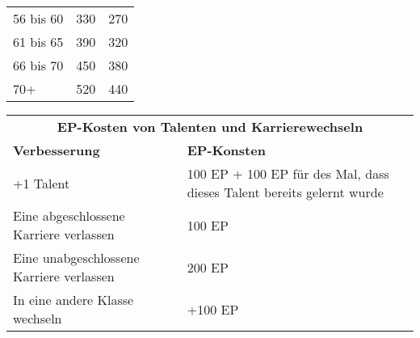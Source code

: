 \documentclass[a4paper, fontsize=11pt]{scrartcl}
\begin{document}
\begin{table}[!ht]
\begin{tabularx}{\textwidth}{l|l|l}
        56 bis 60                     & 330                                          & 270                                     \\ \cline{1-3}
        61 bis 65                     & 390                                          & 320                                     \\ \cline{1-3}
        66 bis 70                     & 450                                          & 380                                     \\ \cline{1-3}
        70+                           & 520                                          & 440
    \end{tabularx}
\end{table}

\begin{table}[!ht]
    \centering
    \begin{tabularx}{\textwidth}{l|X}
        \multicolumn{2}{c}{\cellcolor{gray!25} \textbf{EP-Kosten von Talenten und Karrierewechseln}                                                 } \\ \cline{1-2}
        \textbf{Verbesserung}                    & \textbf{EP-Konsten}                                                                                \\ \cline{1-2}
        +1 Talent                                & 100 EP + 100 EP für des Mal, dass dieses Talent bereits gelernt wurde                              \\ \cline{1-2}
        Eine abgeschlossene Karriere verlassen   & 100 EP                                                                                             \\ \cline{1-2}
        Eine unabgeschlossene Karriere verlassen & 200 EP                                                                                             \\ \cline{1-2}
        In eine andere Klasse wechseln           & +100 EP
    \end{tabularx}
\end{table}
\end{document}

